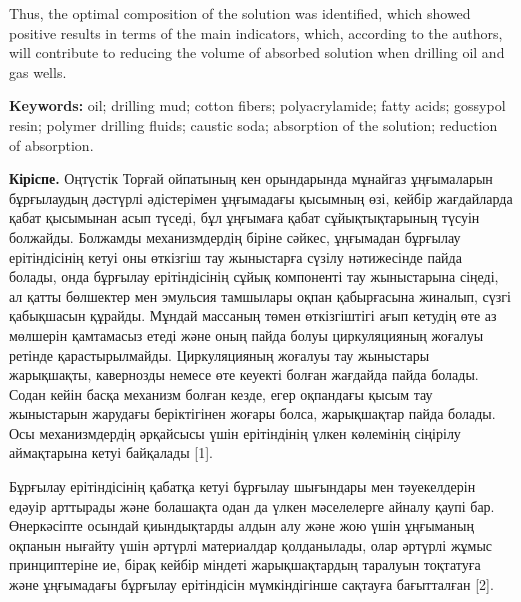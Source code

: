 Thus, the optimal composition of the solution was identified, which
showed positive results in terms of the main indicators, which,
according to the authors, will contribute to reducing the volume of
absorbed solution when drilling oil and gas wells.

{\bfseries Keywords:} oil; drilling mud; cotton fibers;
polyacrylamide; fatty acids; gossypol resin; polymer drilling fluids;
caustic soda; absorption of the solution; reduction of absorption.

\begin{multicols}{2}
{\bfseries Кіріспе.} Оңтүстік Торғай ойпатының кен орындарында мұнайгаз
ұңғымаларын бұрғылаудың дәстүрлі әдістерімен ұңғымадағы қысымның өзі,
кейбір жағдайларда қабат қысымынан асып түседі, бұл ұңғымаға қабат
сұйықтықтарының түсуін болжайды. Болжамды механизмдердің біріне сәйкес,
ұңғымадан бұрғылау ерітіндісінің кетуі оны өткізгіш тау жыныстарға
сүзілу нәтижесінде пайда болады, онда бұрғылау ерітіндісінің сұйық
компоненті тау жыныстарына сіңеді, ал қатты бөлшектер мен эмульсия
тамшылары оқпан қабырғасына жиналып, сүзгі қабықшасын құрайды. Мұндай
массаның төмен өткізгіштігі ағып кетудің өте аз мөлшерін қамтамасыз
етеді және оның пайда болуы циркуляцияның жоғалуы ретінде
қарастырылмайды. Циркуляцияның жоғалуы тау жыныстары жарықшақты,
кавернозды немесе өте кеуекті болған жағдайда пайда болады. Содан кейін
басқа механизм болған кезде, егер оқпандағы қысым тау жыныстарын
жарудағы беріктігінен жоғары болса, жарықшақтар пайда болады. Осы
механизмдердің әрқайсысы үшін ерітіндінің үлкен көлемінің сіңірілу
аймақтарына кетуі байқалады {[}1{]}.

Бұрғылау ерітіндісінің қабатқа кетуі бұрғылау шығындары мен тәуекелдерін
едәуір арттырады және болашақта одан да үлкен мәселелерге айналу қаупі
бар. Өнеркәсіпте осындай қиындықтарды алдын алу және жою үшін ұңғыманың
оқпанын нығайту үшін әртүрлі материалдар қолданылады, олар әртүрлі жұмыс
принциптеріне ие, бірақ кейбір міндеті жарықшақтардың таралуын тоқтатуға
және ұңғымадағы бұрғылау ерітіндісін мүмкіндігінше сақтауға бағытталған
{[}2{]}.


\end{multicols}
